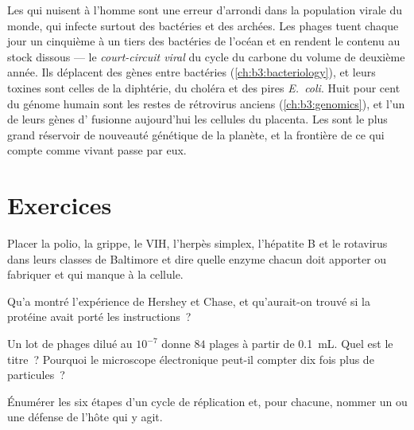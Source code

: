 \begin{remark}\label{rem:b3:virology:economy}
Les  qui nuisent à l'homme sont une erreur d'arrondi dans la
population virale du monde, qui infecte surtout des bactéries et des
archées. Les phages tuent chaque jour un cinquième à un tiers des
bactéries de l'océan et en rendent le contenu au stock dissous --- le
\emph{court-circuit viral} du cycle du carbone du volume de deuxième
année. Ils déplacent des gènes entre bactéries
(\cref{ch:b3:bacteriology}), et leurs toxines sont celles de la
diphtérie, du choléra et des pires \emph{E.~coli}. Huit pour cent du
génome humain sont les restes de rétrovirus anciens
(\cref{ch:b3:genomics}), et l'un de leurs gènes d' fusionne
aujourd'hui les cellules du placenta. Les  sont le plus grand
réservoir de nouveauté génétique de la planète, et la frontière de ce
qui compte comme vivant passe par eux.
\end{remark}

\section{Exercices}

\begin{exercise}[$\star$]\label{exo:b3:virology:1}
Placer la polio, la grippe, le VIH, l'herpès simplex, l'hépatite B et
le rotavirus dans leurs classes de Baltimore et dire quelle enzyme
chacun doit apporter ou fabriquer et qui manque à la cellule.
\end{exercise}

\begin{exercise}[$\star$]\label{exo:b3:virology:2}
Qu'a montré l'expérience de Hershey et Chase, et qu'aurait-on trouvé si
la protéine avait porté les instructions~?
\end{exercise}

\begin{exercise}[$\star$]\label{exo:b3:virology:3}
Un lot de phages dilué au $10^{-7}$ donne $84$ plages à partir de
\qty{0.1}{mL}. Quel est le titre~? Pourquoi le microscope électronique
peut-il compter dix fois plus de particules~?
\end{exercise}

\begin{exercise}[$\star$]\label{exo:b3:virology:4}
Énumérer les six étapes d'un cycle de réplication et, pour chacune,
nommer un  ou une défense de l'hôte qui y agit.
\end{exercise}

